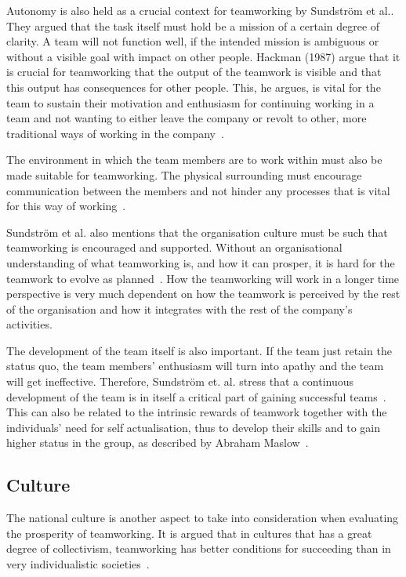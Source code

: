 \documentclass[a4paper,12pt,titlepage]{article}
\begin{document}
  Autonomy is also held as a crucial context for teamworking
  by Sundstr\"{o}m et al.. They argued that
  the task itself must hold be a mission of a certain degree
  of clarity. A team will not function well, if the intended mission
  is ambiguous or without a visible goal with impact on other people.
  Hackman (1987) argue that it is crucial for teamworking
  that the output of the teamwork is visible
  and that this output has consequences for other people. This, he argues,
  is vital for the team to sustain their motivation and enthusiasm for
  continuing working in a team and not wanting to either leave
  the company or revolt to other, more traditional ways of working
  in the company~\cite[375-8]{ahdb}. 
  
  The environment in which the team members are to work within must
  also be made suitable for teamworking. The physical surrounding must
  encourage communication between the members and not hinder
  any processes that is vital for this way of working~\cite[375]{ahdb}.

  Sundstr\"{o}m et al. also mentions that the organisation culture must
  be such that teamworking is encouraged and supported. Without an
  organisational understanding of what teamworking is, and how it
  can prosper, it is hard for the teamwork to evolve as
  planned~\cite[396]{ahdb}. How the teamworking will work in a longer
  time perspective is very much dependent on how the teamwork is
  perceived by the rest of the organisation and how it integrates
  with the rest of the company's activities.

  The development of the team itself is also important. If the
  team just retain the status quo, the team members' enthusiasm will 
  turn into apathy and the team will get ineffective.
  Therefore, Sundstr\"{o}m et. al. stress that
  a continuous development of the team is in itself a critical
  part of gaining successful teams~\cite[398]{ahdb}. This can also be related
  to the intrinsic rewards of teamwork together with the individuals'
  need for self actualisation, thus to develop their skills and to gain higher
  status in the group, as described by Abraham Maslow~\cite[22]{am}.
  
  \subsection{Culture}
  The national culture is another aspect to take into consideration
  when evaluating the prosperity of teamworking. It is argued that
  in cultures that has a great degree of collectivism, teamworking
  has better conditions for succeeding than in very individualistic
  societies~\cite[294]{sr}. 
\end{document}
